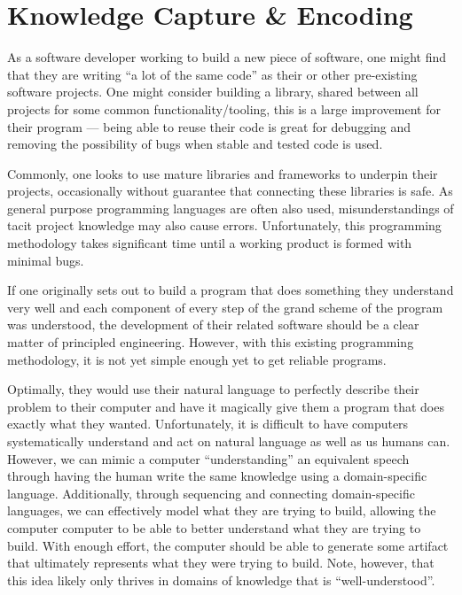 \section{Knowledge Capture \& Encoding}


As a software developer working to build a new piece of software, one might
find that they are writing ``a lot of the same code'' as their or other
pre-existing software projects. One might consider building a library, shared
between all projects for some common functionality/tooling, this is a large
improvement for their program --- being able to reuse their code is great for
debugging and removing the possibility of bugs when stable and tested code is
used.


Commonly, one looks to use mature libraries and frameworks to underpin their
projects, occasionally without guarantee that connecting these libraries is safe.
As general purpose programming languages are often also used, misunderstandings
of tacit project knowledge may also cause errors. Unfortunately, this
programming methodology takes significant time until a working product is formed
with minimal bugs.

If one originally sets out to build a program that does something they
understand very well and each component of every step of the grand scheme of the
program was understood, the development of their related software should be a
clear matter of principled engineering. However, with this existing programming
methodology, it is not yet simple enough yet to get reliable programs.

Optimally, they would use their natural language to perfectly describe their
problem to their computer and have it magically give them a program that does
exactly what they wanted. Unfortunately, it is difficult to have computers
systematically understand and act on natural language as well as us humans can.
However, we can mimic a computer ``understanding'' an equivalent speech through
having the human write the same knowledge using a domain-specific language.
Additionally, through sequencing and connecting domain-specific languages, we
can effectively model what they are trying to build, allowing the computer
computer to be able to better understand what they are trying to build. With
enough effort, the computer should be able to generate some artifact that
ultimately represents what they were trying to build. Note, however, that this
idea likely only thrives in domains of knowledge that is
``well\hyp{}understood''.

